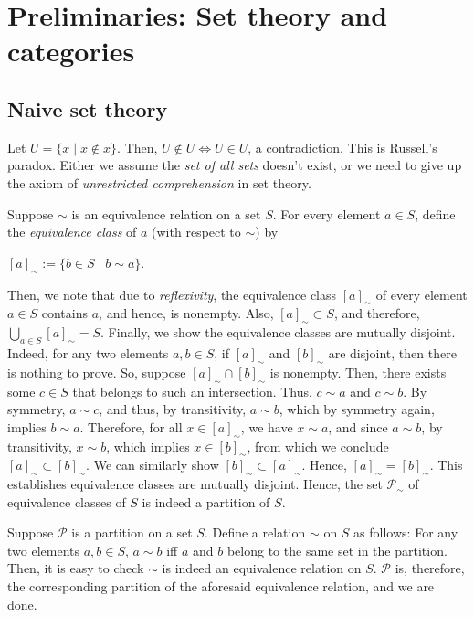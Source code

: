 \chapter{Preliminaries: Set theory and categories}

\section{Naive set theory}
\begin{xca}
Let $U = \{ x \mid x \not\in x \}$. Then, $U \not\in U \iff U \in U$, a
contradiction. This is Russell's paradox. Either we assume the \emph{set of all
sets} doesn't exist, or we need to give up the axiom of \emph{unrestricted
comprehension} in set theory.
\end{xca}

\begin{xca}
Suppose $\sim$ is an equivalence relation on a set $S$. For every element $a \in
S$, define the \emph{equivalence class} of $a$ (with respect to $\sim$) by
\begin{center}
$[a]_{\sim} := \{ b \in S \mid b \sim a \}$.
\end{center}
Then, we note that due to \emph{reflexivity}, the equivalence class
$[a]_{\sim}$ of every element $a \in S$ contains $a$, and hence, is nonempty.
Also, $[a]_{\sim} \subset S$, and therefore, $\bigcup_{a \in S} [a]_{\sim} =
S$. Finally, we show the equivalence classes are mutually disjoint. Indeed, for
any two elements $a, b \in S$, if $[a]_{\sim}$ and $[b]_{\sim}$ are disjoint,
then there is nothing to prove. So, suppose $[a]_{\sim} \cap [b]_{\sim}$ is
nonempty. Then, there exists some $c \in S$ that belongs to such an
intersection. Thus, $c \sim a$ and $c \sim b$. By symmetry, $a \sim c$, and
thus, by transitivity, $a \sim b$, which by symmetry again, implies $b \sim a$.
Therefore, for all $x \in [a]_{\sim}$, we have $x \sim a$, and since $a \sim
b$, by transitivity, $x \sim b$, which implies $x \in [b]_{\sim}$, from which
we conclude $[a]_{\sim} \subset [b]_{\sim}$. We can similarly show $[b]_{\sim}
\subset [a]_{\sim}$. Hence, $[a]_{\sim} = [b]_{\sim}$. This establishes
equivalence classes are mutually disjoint. Hence, the set $\mathscr{P}_{\sim}$
of equivalence classes of $S$ is indeed a partition of $S$.
\end{xca}

\begin{xca}
Suppose $\mathscr{P}$ is a partition on a set $S$. Define a relation $\sim$ on
$S$ as follows: For any two elements $a, b \in S$, $a \sim b$ iff $a$ and $b$
belong to the same set in the partition. Then, it is easy to check $\sim$ is
indeed an equivalence relation on $S$. $\mathscr{P}$ is, therefore, the
corresponding partition of the aforesaid equivalence relation, and we are done.
\end{xca}

